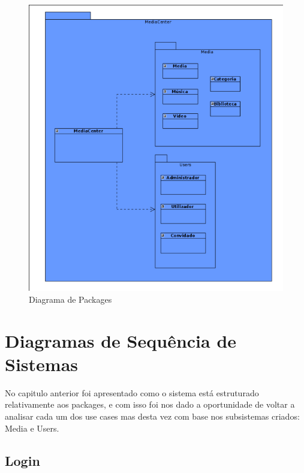 \documentclass[a4paper]{report}
\begin{document}
\begin{figure}[H]
	\centering 
    \includegraphics[width=\textwidth]{images/packages.png}  
    \caption{Diagrama de Packages}
\end{figure}

\chapter{Diagramas de Sequência de Sistemas}

No capitulo anterior foi apresentado como o sistema está estruturado relativamente aos
packages, e com isso foi nos dado a oportunidade de voltar a analisar cada um
dos use cases mas desta vez com base nos subsistemas criados: Media e Users.

\section{Login}
\end{document}

